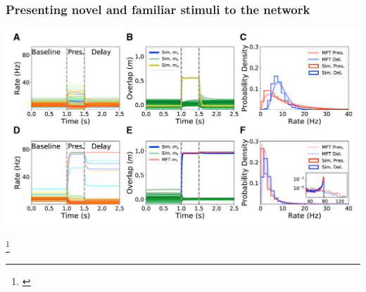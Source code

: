 \documentclass[aspectratio=169]{beamer}
\begin{document}
\begin{frame}[plain]
\frametitle{Presenting novel and familiar stimuli to the network}

\vspace{0.2in}

\begin{center}
\includegraphics[scale=0.4]{novel-familiar}
\end{center}

\footnote{\cite{peirera}}

\end{frame}




\begin{thebibliography}{99} 
\end{thebibliography}
\end{document}
